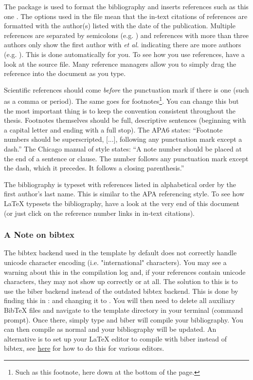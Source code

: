 The  package is used to format the bibliography and inserts references such as this one \parencite{Reference1}. The options used in the  file mean that the in-text citations of references are formatted with the author(s) listed with the date of the publication. Multiple references are separated by semicolons (e.g. \parencite{Reference2, Reference1}) and references with more than three authors only show the first author with \emph{et al.} indicating there are more authors (e.g. \parencite{Reference3}). This is done automatically for you. To see how you use references, have a look at the  source file. Many reference managers allow you to simply drag the reference into the document as you type.

Scientific references should come \emph{before} the punctuation mark if there is one (such as a comma or period). The same goes for footnotes\footnote{Such as this footnote, here down at the bottom of the page.}. You can change this but the most important thing is to keep the convention consistent throughout the thesis. Footnotes themselves should be full, descriptive sentences (beginning with a capital letter and ending with a full stop). The APA6 states: \enquote{Footnote numbers should be superscripted, [...], following any punctuation mark except a dash.} The Chicago manual of style states: \enquote{A note number should be placed at the end of a sentence or clause. The number follows any punctuation mark except the dash, which it precedes. It follows a closing parenthesis.}

The bibliography is typeset with references listed in alphabetical order by the first author's last name. This is similar to the APA referencing style. To see how \LaTeX{} typesets the bibliography, have a look at the very end of this document (or just click on the reference number links in in-text citations).

\subsubsection{A Note on bibtex}

The bibtex backend used in the template by default does not correctly handle unicode character encoding (i.e. "international" characters). You may see a warning about this in the compilation log and, if your references contain unicode characters, they may not show up correctly or at all. The solution to this is to use the biber backend instead of the outdated bibtex backend. This is done by finding this in :  and changing it to . You will then need to delete all auxiliary BibTeX files and navigate to the template directory in your terminal (command prompt). Once there, simply type  and biber will compile your bibliography. You can then compile  as normal and your bibliography will be updated. An alternative is to set up your LaTeX editor to compile with biber instead of bibtex, see \href{http://tex.stackexchange.com/questions/154751/biblatex-with-biber-configuring-my-editor-to-avoid-undefined-citations/}{here} for how to do this for various editors.
